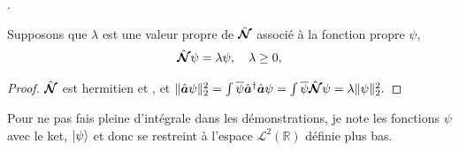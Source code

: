 {%
}.

\begin{Lemm}
Supposons que $\lambda$ est une valeur propre de $\hat{\bm{\mathcal N}}$ associé à la fonction propre $\psi$,
\begin{eqnarray}
    \hat{\bm{\mathcal N}}\psi = \lambda \psi, \quad \lambda \geq 0,
\end{eqnarray}
\end{Lemm}
\begin{proof}
$\hat{\bm{\mathcal N}}$ est hermitien et \cite{cohen1973mecanique1}, et $\Vert \hat{\bm{a}} \psi \Vert_2^2 = \int \overline{\psi} \hat{\bm{a}}^\dag  \hat{\bm{a}} \psi = \int \overline{\psi} \hat{\bm{\mathcal N}} \psi = \lambda \Vert \psi \Vert_2^2.$
\end{proof}

Pour ne pas fais pleine d'intégrale dans les démonstrations, je note les fonctions $\psi$ avec le \guillemotleft{}ket\guillemotright{}, $\ket{\psi}$ et donc se restreint à l'espace $\mathcal L^2(\mathbb R)$ définie plus bas.

